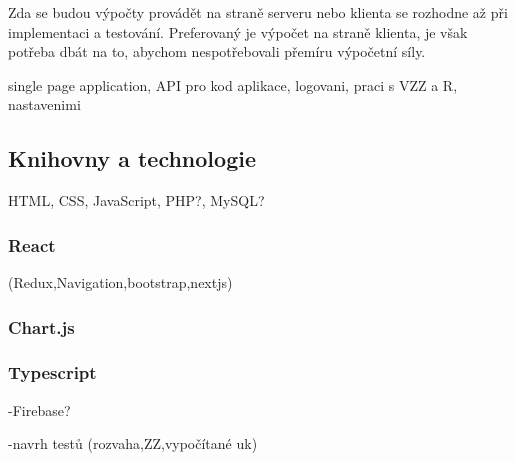 Zda se budou výpočty provádět na straně serveru nebo klienta se rozhodne až při implementaci a testování. Preferovaný je výpočet na straně klienta, je však potřeba dbát na to, abychom nespotřebovali přemíru výpočetní síly.

single page application, API pro kod aplikace, logovani, praci s VZZ a R, nastavenimi

\subsection{Knihovny a technologie}
HTML, CSS, JavaScript, PHP?, MySQL?

\subsubsection{React}

(Redux,Navigation,bootstrap,nextjs)

\subsubsection{Chart.js}
\subsubsection{Typescript}



-Firebase?

-navrh testů (rozvaha,ZZ,vypočítané uk)

